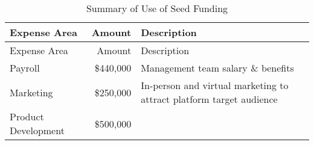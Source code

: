 \documentclass[10pt,openany]{book}
\begin{document}
\begin{longtable}[]{@{}lrl@{}}
\caption{Summary of Use of Seed Funding}\tabularnewline
\toprule
\begin{minipage}[b]{0.27\columnwidth}\raggedright
Expense Area\strut
\end{minipage} & \begin{minipage}[b]{0.14\columnwidth}\raggedleft
Amount\strut
\end{minipage} & \begin{minipage}[b]{0.50\columnwidth}\raggedright
Description\strut
\end{minipage}\tabularnewline
\midrule
\endfirsthead
\toprule
\begin{minipage}[b]{0.27\columnwidth}\raggedright
Expense Area\strut
\end{minipage} & \begin{minipage}[b]{0.14\columnwidth}\raggedleft
Amount\strut
\end{minipage} & \begin{minipage}[b]{0.50\columnwidth}\raggedright
Description\strut
\end{minipage}\tabularnewline
\midrule
\endhead
\begin{minipage}[t]{0.27\columnwidth}\raggedright
Payroll\strut
\end{minipage} & \begin{minipage}[t]{0.14\columnwidth}\raggedleft
\$440,000\strut
\end{minipage} & \begin{minipage}[t]{0.50\columnwidth}\raggedright
Management team salary \& benefits\strut
\end{minipage}\tabularnewline
\begin{minipage}[t]{0.27\columnwidth}\raggedright
Marketing\strut
\end{minipage} & \begin{minipage}[t]{0.14\columnwidth}\raggedleft
\$250,000\strut
\end{minipage} & \begin{minipage}[t]{0.50\columnwidth}\raggedright
In-person and virtual marketing to attract platform target
audience\strut
\end{minipage}\tabularnewline
\begin{minipage}[t]{0.27\columnwidth}\raggedright
Product Development\strut
\end{minipage} & \begin{minipage}[t]{0.14\columnwidth}\raggedleft
\$500,000\strut
\end{minipage} & \begin{minipage}[t]{0.50\columnwidth}\raggedright

\end{minipage}
\end{longtable}
\end{document}
